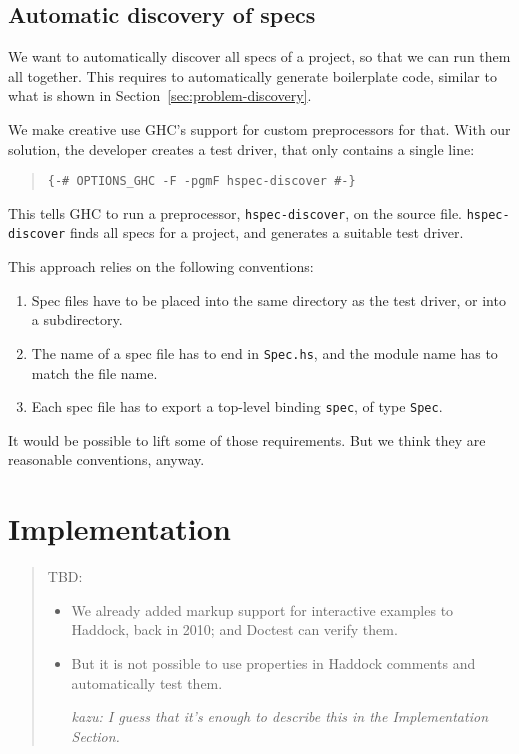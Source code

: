 \documentclass[preprint]{sigplanconf}
\begin{document}
\subsection{Automatic discovery of specs}
\label{sec:solution-discovery}

We want to automatically discover all specs of a project, so that we
can run them all together.  This requires to automatically generate
boilerplate code, similar to what is shown in
Section~\ref{sec:problem-discovery}.

We make creative use GHC's support for custom preprocessors for
that.  With our solution, the developer creates a test driver, that only
contains a single line:

\begin{quote}
\small
\begin{verbatim}
{-# OPTIONS_GHC -F -pgmF hspec-discover #-}
\end{verbatim}
\end{quote}

\noindent This tells GHC to run a preprocessor, \verb|hspec-discover|, on the
source file.  \verb|hspec-discover| finds all specs for a project, and
generates a suitable test driver.

This approach relies on the following conventions:
\begin{enumerate}
    \item
        Spec files have to be placed into the same directory as the
        test driver, or into a subdirectory.
    \item
        The name of a spec file has to end in \verb|Spec.hs|, and the
        module name has to match the file name.
    \item
        Each spec file has to export a top-level binding \verb|spec|,
        of type \verb|Spec|.
\end{enumerate}

\noindent It would be possible to lift some of those requirements.
But we think they are reasonable conventions, anyway.


\section{Implementation}

\begin{quote}
TBD:
\begin{itemize}
    \item
        We already added markup support for interactive examples to
        Haddock, back in 2010; and Doctest can verify them.
    \item
        But it is not possible to use properties in Haddock comments
        and automatically test them.

    \emph{kazu: I guess that it's enough to describe this in the Implementation Section.}
\end{itemize}
\end{quote}
\end{document}
